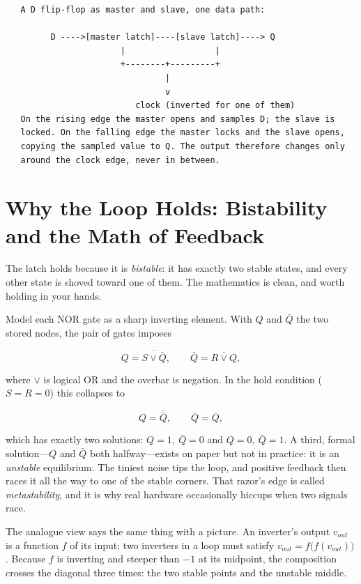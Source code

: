 \begin{verbatim}
   A D flip-flop as master and slave, one data path:

         D ---->[master latch]----[slave latch]----> Q
                       |                  |
                       +--------+---------+
                                |
                                v
                          clock (inverted for one of them)
   On the rising edge the master opens and samples D; the slave is
   locked. On the falling edge the master locks and the slave opens,
   copying the sampled value to Q. The output therefore changes only
   around the clock edge, never in between.
\end{verbatim}

\section{Why the Loop Holds: Bistability and the Math of Feedback}
\label{sec:bistable}

The latch holds because it is \emph{bistable}: it has exactly two
stable states, and every other state is shoved toward one of them.
The mathematics is clean, and worth holding in your hands.

Model each NOR gate as a sharp inverting element. With $Q$ and
$\bar{Q}$ the two stored nodes, the pair of gates imposes

\begin{equation}
Q = \overline{S \lor \bar{Q}}, \qquad \bar{Q} = \overline{R \lor Q},
\end{equation}

where $\lor$ is logical OR and the overbar is negation. In the hold
condition ($S = R = 0$) this collapses to

\begin{equation}
Q = \overline{\bar{Q}}, \qquad \bar{Q} = \overline{Q},
\end{equation}

which has exactly two solutions: $Q=1,\ \bar{Q}=0$ and $Q=0,\
\bar{Q}=1$. A third, formal solution---$Q$ and $\bar{Q}$ both
halfway---exists on paper but not in practice: it is an
\emph{unstable} equilibrium. The tiniest noise tips the loop, and
positive feedback then races it all the way to one of the stable
corners. That razor's edge is called \emph{metastability}, and it is
why real hardware occasionally hiccups when two signals race.

The analogue view says the same thing with a picture. An inverter's
output $v_{out}$ is a function $f$ of its input; two inverters in a
loop must satisfy $v_{out} = f\bigl(f(v_{out})\bigr)$. Because $f$
is inverting and steeper than $-1$ at its midpoint, the composition
crosses the diagonal three times: the two stable points and the
unstable middle.

